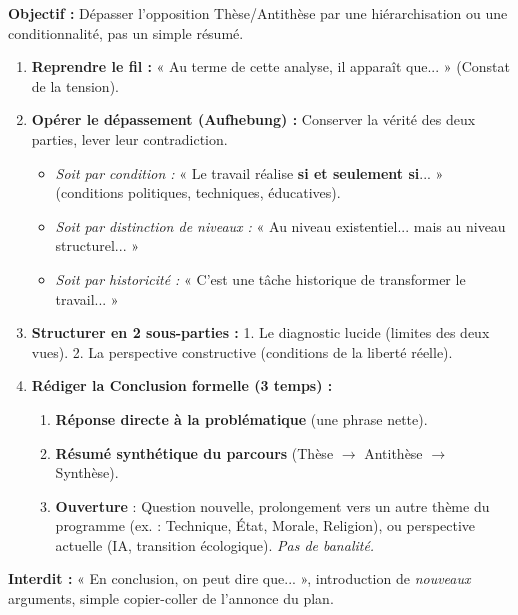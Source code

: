 \documentclass[11pt]{article}
\newcommand{\cle}[1]{{\popxbold\color{popdark}#1}}
\begin{document}
\begin{methode}
\textbf{Objectif :} Dépasser l'opposition Thèse/Antithèse par une \cle{hiérarchisation} ou une \cle{conditionnalité}, pas un simple résumé.
\begin{enumerate}
    \item \textbf{Reprendre le fil :} « Au terme de cette analyse, il apparaît que... » (Constat de la tension).
    \item \textbf{Opérer le dépassement (Aufhebung) :} Conserver la vérité des deux parties, lever leur contradiction.
        \begin{itemize}
            \item \emph{Soit par condition :} « Le travail réalise \textbf{si et seulement si}... » (conditions politiques, techniques, éducatives).
            \item \emph{Soit par distinction de niveaux :} « Au niveau existentiel... mais au niveau structurel... »
            \item \emph{Soit par historicité :} « C'est une tâche historique de transformer le travail... »
        \end{itemize}
    \item \textbf{Structurer en 2 sous-parties :} 1. Le diagnostic lucide (limites des deux vues). 2. La perspective constructive (conditions de la liberté réelle).
    \item \textbf{Rédiger la Conclusion formelle (3 temps) :}
        \begin{enumerate}
            \item \textbf{Réponse directe à la problématique} (une phrase nette).
            \item \textbf{Résumé synthétique du parcours} (Thèse $\rightarrow$ Antithèse $\rightarrow$ Synthèse).
            \item \textbf{Ouverture} : Question nouvelle, prolongement vers un autre thème du programme (ex. : Technique, État, Morale, Religion), ou perspective actuelle (IA, transition écologique). \emph{Pas de banalité.}
        \end{enumerate}
\end{enumerate}
\textbf{Interdit :} « En conclusion, on peut dire que... », introduction de \emph{nouveaux} arguments, simple copier-coller de l'annonce du plan.
\end{methode}
\end{document}
